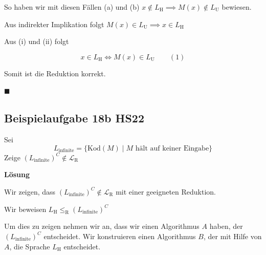 \documentclass[a4paper, 11pt]{article}
\def\Lr{\mathcal{L}_\text{R}}
\begin{document}
\begin{enumerate}[label=(\roman*)]
\begin{enumerate}[label=(\alph*)]
                                   
                                    
                                    
                                \end{enumerate}
                                
                                 So haben wir mit diesen Fällen (a) und (b) $x \notin L_{\text{H}} \implies M(x) \notin L_{\text{U}}$ bewiesen. 
                                 
                                 Aus indirekter Implikation folgt $M(x) \in L_{\text{U}} \implies x \in L_{\text{H}}$
                                     
                        \end{enumerate}
                
                   
                
                    Aus (i) und (ii) folgt 
                    
                    $$x \in L_{\text{H}} \iff M(x) \in L_{\text{U}} \qquad (1)$$
                
                    Somit ist die Reduktion korrekt.
                
                    \hspace*{0pt}\hfill$\blacksquare$
                
                
                
                    \subsection{Beispielaufgabe 18b HS22}
    
                    Sei $$L_{\text{infinite}} = \{\text{Kod}(M) \mid \text{$M$ hält auf keiner Eingabe}\}$$
                    Zeige $(L_{\text{infinite}})^C \notin \Lr$
                
                
                    \textbf{Lösung}
    
                    Wir zeigen, dass $(L_{\text{infinite}})^C \notin \Lr$ mit einer geeigneten Reduktion.
                
                    Wir beweisen $L_{\text{H}} \leq_{\text{R}} (L_{\text{infinite}})^C$
                
                    Um dies zu zeigen nehmen wir an, dass wir einen Algorithmus $A$ haben, der $(L_{\text{infinite}})^C$ entscheidet.
                     Wir konstruieren einen Algorithmus $B$, der mit Hilfe von $A$, die Sprache $L_{\text{H}}$ entscheidet. 
                     
\end{document}
